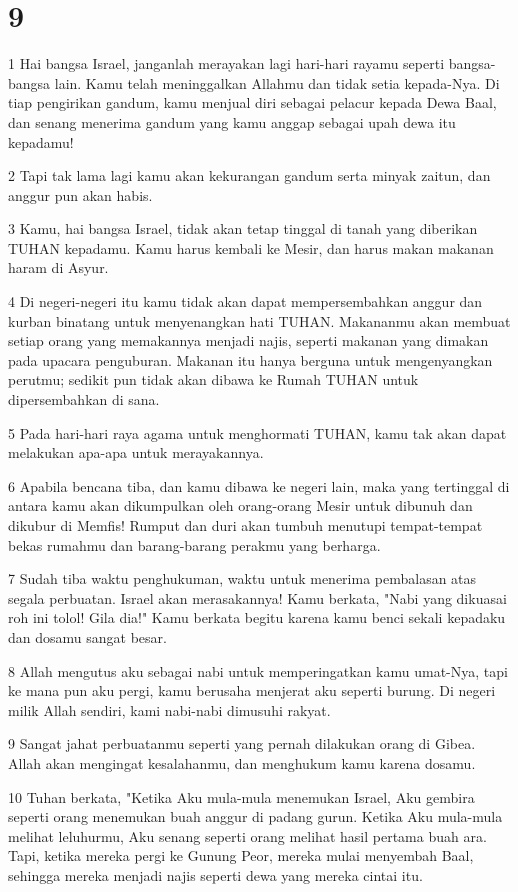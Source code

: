 \chapter{9}

\par 1 Hai bangsa Israel, janganlah merayakan lagi hari-hari rayamu seperti bangsa-bangsa lain. Kamu telah meninggalkan Allahmu dan tidak setia kepada-Nya. Di tiap pengirikan gandum, kamu menjual diri sebagai pelacur kepada Dewa Baal, dan senang menerima gandum yang kamu anggap sebagai upah dewa itu kepadamu!
\par 2 Tapi tak lama lagi kamu akan kekurangan gandum serta minyak zaitun, dan anggur pun akan habis.
\par 3 Kamu, hai bangsa Israel, tidak akan tetap tinggal di tanah yang diberikan TUHAN kepadamu. Kamu harus kembali ke Mesir, dan harus makan makanan haram di Asyur.
\par 4 Di negeri-negeri itu kamu tidak akan dapat mempersembahkan anggur dan kurban binatang untuk menyenangkan hati TUHAN. Makananmu akan membuat setiap orang yang memakannya menjadi najis, seperti makanan yang dimakan pada upacara penguburan. Makanan itu hanya berguna untuk mengenyangkan perutmu; sedikit pun tidak akan dibawa ke Rumah TUHAN untuk dipersembahkan di sana.
\par 5 Pada hari-hari raya agama untuk menghormati TUHAN, kamu tak akan dapat melakukan apa-apa untuk merayakannya.
\par 6 Apabila bencana tiba, dan kamu dibawa ke negeri lain, maka yang tertinggal di antara kamu akan dikumpulkan oleh orang-orang Mesir untuk dibunuh dan dikubur di Memfis! Rumput dan duri akan tumbuh menutupi tempat-tempat bekas rumahmu dan barang-barang perakmu yang berharga.
\par 7 Sudah tiba waktu penghukuman, waktu untuk menerima pembalasan atas segala perbuatan. Israel akan merasakannya! Kamu berkata, "Nabi yang dikuasai roh ini tolol! Gila dia!" Kamu berkata begitu karena kamu benci sekali kepadaku dan dosamu sangat besar.
\par 8 Allah mengutus aku sebagai nabi untuk memperingatkan kamu umat-Nya, tapi ke mana pun aku pergi, kamu berusaha menjerat aku seperti burung. Di negeri milik Allah sendiri, kami nabi-nabi dimusuhi rakyat.
\par 9 Sangat jahat perbuatanmu seperti yang pernah dilakukan orang di Gibea. Allah akan mengingat kesalahanmu, dan menghukum kamu karena dosamu.
\par 10 Tuhan berkata, "Ketika Aku mula-mula menemukan Israel, Aku gembira seperti orang menemukan buah anggur di padang gurun. Ketika Aku mula-mula melihat leluhurmu, Aku senang seperti orang melihat hasil pertama buah ara. Tapi, ketika mereka pergi ke Gunung Peor, mereka mulai menyembah Baal, sehingga mereka menjadi najis seperti dewa yang mereka cintai itu.

